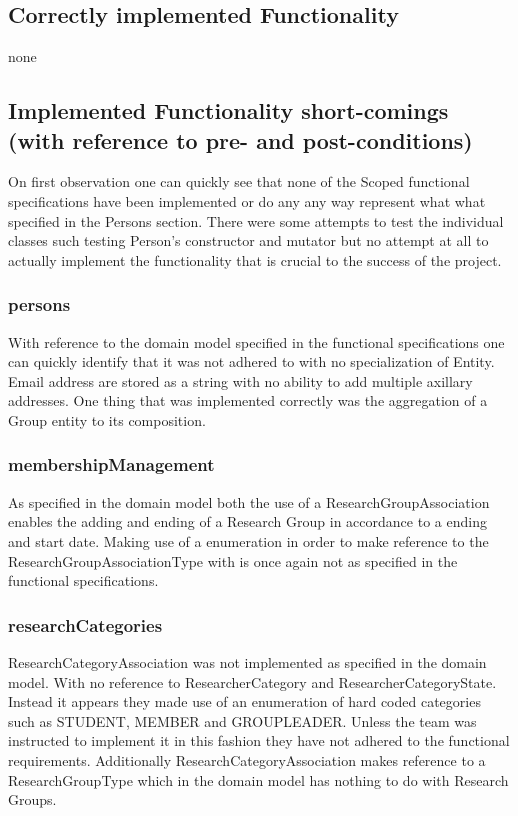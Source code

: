 \documentclass{article}
\begin{document}
	\subsection{Correctly implemented Functionality}
	
	none

    \subsection{Implemented Functionality short-comings (with reference to pre- and post-conditions)}
    
    	On first observation one can quickly see that none of the Scoped functional specifications have been implemented or do any any way represent what what specified in the Persons section. There were some attempts to test the individual classes such testing Person's constructor and mutator but no attempt at all to actually implement the functionality that is crucial to the success of the project.
	
		\subsubsection{persons}
		With reference to the domain model specified in the functional specifications one can quickly identify that it was not adhered to with no specialization of Entity. Email address are stored as a string with no ability to add multiple axillary addresses. One thing that was implemented correctly was the aggregation of a Group entity to its composition.

		\subsubsection{membershipManagement}
		As specified in the domain model both the use of a ResearchGroupAssociation enables the adding and ending of a Research Group in accordance to a ending and start date. Making use of a enumeration in order to make reference to the ResearchGroupAssociationType with is once again not as specified in the functional specifications. 

		\subsubsection{researchCategories}
		ResearchCategoryAssociation was not implemented as specified in the domain model. With no reference to ResearcherCategory and ResearcherCategoryState. Instead it appears they made use of an enumeration of hard coded categories such as STUDENT, MEMBER and GROUPLEADER. Unless the team was instructed to implement it in this fashion they have not adhered to the functional requirements. Additionally ResearchCategoryAssociation makes reference to a ResearchGroupType which in the domain model has nothing to do with Research Groups.
\end{document}
